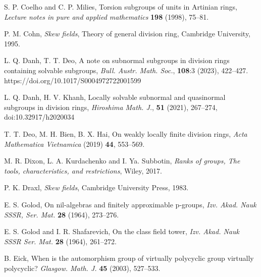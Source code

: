 \documentclass{amsart}
\theoremstyle{definition}
\begin{document}
\begin{thebibliography}{}
	
	
 S. P. Coelho and C. P. Milies, Torsion subgroups of units in Artinian rings, \textit{Lecture notes in pure and applied mathematics} \textbf{198} (1998), 75--81.
	
 P. M. Cohn, \textit{Skew fields}, Theory of general division ring, Cambridge University, 1995.	

 L. Q. Danh, T. T. Deo, A note on subnormal subgroups in division rings containing solvable subgroups, \textit{Bull. Austr. Math. Soc.}, \textbf{108}:3 (2023), 422--427. https://doi.org/10.1017/S0004972722001599

 L. Q. Danh, H. V. Khanh, Locally solvable subnormal and quasinormal subgroups in division rings, \textit{Hiroshima Math. J.}, \textbf{51} (2021), 267--274, doi:10.32917/h2020034
		
 T. T. Deo, M. H. Bien, B. X. Hai, On weakly locally finite division rings, \textit{Acta Mathematica Vietnamica} (2019) \textbf{44}, 553--569.
	
	
 M. R. Dixon, L. A. Kurdachenko and I. Ya. Subbotin, \textit{Ranks of groups, The tools, characteristics, and restrictions}, Wiley, 2017.
	
 P. K. Draxl, \textit{Skew fields}, Cambridge University Press, 1983.
	
 E. S. Golod, On nil-algebras and finitely approximable p-groups, \textit{Izv. Akad. Nauk SSSR, Ser. Mat.} \textbf{28} (1964), 273--276.
	
 E. S. Golod and I. R. Shafarevich, On the class field tower, \textit{Izv. Akad. Nauk SSSR Ser. Mat.} \textbf{28} (1964), 261--272.
	
 B. Eick, When is the automorphism group of virtually polycyclic group virtually polycyclic?  \textit{Glasgow. Math. J.} \textbf{45} (2003), 527--533.


\end{thebibliography}
\end{document}
